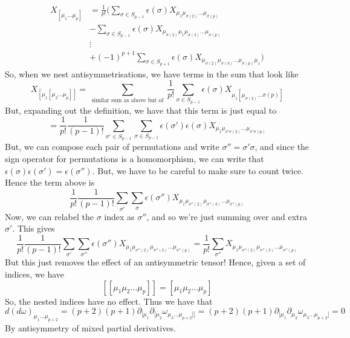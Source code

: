 \begin{align*}
X_{[ \mu_1 \dots \mu_{p } ] } &=    \frac{1}{ p ! } \big (  \sum_{\sigma \in S_{p - 1}} \epsilon ( \sigma ) X_{\mu_1 \mu_{ \sigma ( 2)  } \dots \mu_{ \sigma ( p ) } } \\
&- \sum_{ \sigma \in S_{ p - 1}} \epsilon( \sigma ) X_{ \mu_{ \sigma ( 2 ) } \mu_1  \mu_{ \sigma ( 3)  } \dots \mu_{ \sigma ( p ) }} \\
      & \vdots \\
      & + ( - 1)^{p + 1 } \sum_{ \sigma \in S_{ p + 1  } } \epsilon ( \sigma ) X_{ \mu_{ \sigma ( 2)  } \mu_{ \sigma( 3)  }  \dots \mu_{ \sigma ( p ) } \mu_1 }  \big )  
\end{align*}
So, when we nest antisymmetrisations, we have terms in the sum 
that look like
\[
X_{ [ \mu_1 [ \mu_2 \dots \mu_{p } ]]} =\sum_{ \text{ similar sum as above but of } } \frac{1}{ p ! } \sum_{ \sigma \in S_{ p - 1}  } \epsilon ( \sigma ) X_{ \mu_1 [ \mu_{ \sigma ( 2)  } \dots \sigma ( p )  ] } 
\] But, expanding out the definition, we have that this term 
is just equal to 
\[
= \frac{1}{ p ! } \frac{1}{ ( p - 1 )! } \sum_{ \sigma' \in S_{ p - 1 }  } \sum_{ \sigma \in S_{ p - 1  } } \epsilon( \sigma' ) \epsilon ( \sigma )   X_{ \mu_1  \mu_{ \sigma' \sigma ( 2)  } \dots \mu_{  \sigma' \sigma ( p )   }  } 
\] But, we can compose each pair of permutations and write $ \sigma '' = \sigma' \sigma $, and since 
the sign operator for permutations is a homomorphism, 
we can write that  $ \epsilon ( \sigma ) \epsilon ( \sigma ' ) = \epsilon ( \sigma'' ) $. But, 
we have to be careful to make sure to count twice. Hence the term above is 
\[
\frac{1}{p ! } \frac{1}{ ( p - 1) ! } \sum_{ \sigma'  } \sum_{ \sigma } \epsilon ( \sigma'') X_{ \mu_1 \mu_{ \sigma '' ( 2) } \mu_{ \sigma'' ( 3 ) } \dots \mu_{ \sigma '' ( p ) }}
\] Now, we can relabel the $ \sigma $ index as $ \sigma''$, and so we're just summing 
over and extra $ \sigma' $. This gives
\[
 \frac{1}{p ! } \frac{1}{ ( p - 1 ) ! } \sum_{ \sigma '  } \sum_{ \sigma'' } \epsilon( \sigma '' )  X_{ \mu_1 \mu_{ \sigma '' ( 2) } \mu_{ \sigma'' ( 3 ) } \dots \mu_{ \sigma '' ( p ) }} = \frac{1}{p ! } 
\sum_{ \sigma '' } X_{ \mu_1 \mu_{ \sigma '' ( 2) } \mu_{ \sigma'' ( 3 ) } \dots \mu_{ \sigma '' ( p ) }} 
\] But this just removes the effect of an antisymmetric tensor! Hence, given a set of indices, we have
\[
[ [ \mu_1 \mu_2 \dots \mu_{ p } ] ] = [ \mu_1 \mu_2 \dots \mu_{p } ] 
\] So, the nested indices have no effect. 
Thus we have that 
\[
d ( d \omega  )_{ \mu_1 \dots \mu_{ p + 2 }  } = ( p + 2) ( p + 1 ) \partial_{ [ \mu_1  } \partial_{ [ \mu_2  } \omega _{ \mu_3 \dots \mu_{ p + 2  } ] ] }  = ( p + 2 )( p + 1) \partial _{ [ \mu_1 } \partial_{ \mu_2  } \omega _{ \mu_3 \dots \mu_{ p + 2 }  ] } = 0
\] By antisymmetry of mixed partial derivatives. 


